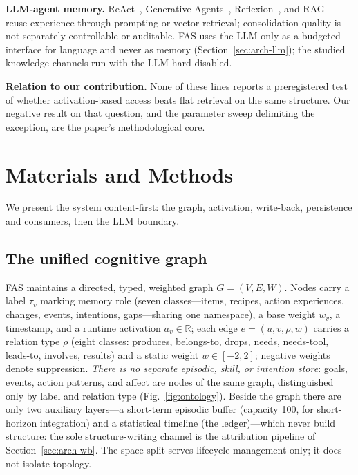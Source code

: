 \documentclass[10pt]{article}
\begin{document}
\textbf{LLM-agent memory.} ReAct~\citep{yao2023react}, Generative Agents~\citep{park2023generative}, Reflexion~\citep{shinn2023reflexion}, and RAG~\citep{lewis2020rag} reuse experience through prompting or vector retrieval; consolidation quality is not separately controllable or auditable. FAS uses the LLM only as a budgeted interface for language and never as memory (Section~\ref{sec:arch-llm}); the studied knowledge channels run with the LLM hard-disabled.

\textbf{Relation to our contribution.} None of these lines reports a preregistered test of whether activation-based access beats flat retrieval on the same structure. Our negative result on that question, and the parameter sweep delimiting the exception, are the paper's methodological core.

\section{Materials and Methods}
\label{sec:arch}

We present the system content-first: the graph, activation, write-back, persistence and consumers, then the LLM boundary.

\subsection{The unified cognitive graph}
\label{sec:arch-graph}
FAS maintains a directed, typed, weighted graph $G=(V,E,W)$. Nodes carry a label $\tau_v$ marking memory role (seven classes---items, recipes, action experiences, changes, events, intentions, gaps---sharing one namespace), a base weight $w_v$, a timestamp, and a runtime activation $a_v\in\mathbb{R}$; each edge $e=(u,v,\rho,w)$ carries a relation type $\rho$ (eight classes: produces, belongs-to, drops, needs, needs-tool, leads-to, involves, results) and a static weight $w\in[-2,2]$; negative weights denote suppression. \emph{There is no separate episodic, skill, or intention store}: goals, events, action patterns, and affect are nodes of the same graph, distinguished only by label and relation type (Fig.~\ref{fig:ontology}). Beside the graph there are only two auxiliary layers---a short-term episodic buffer (capacity 100, for short-horizon integration) and a statistical timeline (the ledger)---which never build structure: the sole structure-writing channel is the attribution pipeline of Section~\ref{sec:arch-wb}. The space split serves lifecycle management only; it does not isolate topology.
\end{document}

